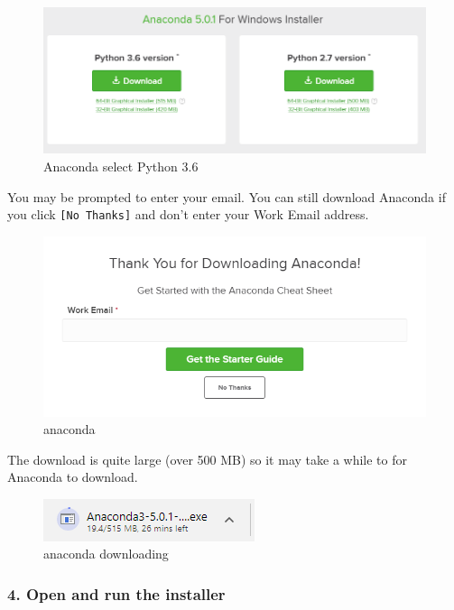 \documentclass{book}
\makeatletter
\def\maxwidth{\ifdim\Gin@nat@width>\linewidth\linewidth
    \else\Gin@nat@width\fi}
\let\Oldincludegraphics\includegraphics
\renewcommand{\includegraphics}[1]{\Oldincludegraphics[width=.8\maxwidth]{#1}}
\makeatother
\begin{document}
\begin{figure}
\centering
\includegraphics{images/anaconda_python3_or_python2.png}
\caption{Anaconda select Python 3.6}
\end{figure}

You may be prompted to enter your email. You can still download Anaconda
if you click \lstinline![No Thanks]! and don't enter your Work Email
address.

\begin{figure}
\centering
\includegraphics{images/anaconda_enter_email.png}
\caption{anaconda}
\end{figure}

The download is quite large (over 500 MB) so it may take a while to for
Anaconda to download.

\begin{figure}
\centering
\includegraphics{images/anaconda_downloading.png}
\caption{anaconda downloading}
\end{figure}
    




    
        \subsubsection{4. Open and run the
installer}\label{open-and-run-the-installer}
\end{document}
